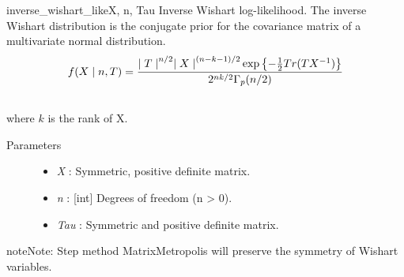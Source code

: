\hypertarget{pymc.distributions.inverse_wishart_like}{}\begin{funcdesc}{inverse\_wishart\_like}{X, n, Tau}
Inverse Wishart log-likelihood. The inverse Wishart distribution is the conjugate
prior for the covariance matrix of a multivariate normal distribution.
\begin{gather}
\begin{split}f(X \mid n, T) = \frac{{\mid T \mid}^{n/2}{\mid X \mid}^{(n-k-1)/2} \exp\left\{ -\frac{1}{2} Tr(TX^{-1}) \right\}}{2^{nk/2} \Gamma_p(n/2)}\end{split}\notag\\\begin{split}\end{split}\notag
\end{gather}
where $k$ is the rank of X.
\begin{description}
\item[Parameters] \leavevmode\begin{itemize}
\item {}
\emph{X} : Symmetric, positive definite matrix.

\item {}
\emph{n} : {[}int{]} Degrees of freedom (n \textgreater{} 0).

\item {}
\emph{Tau} : Symmetric and positive definite matrix.

\end{itemize}

\end{description}

\begin{notice}{note}{Note:}
Step method MatrixMetropolis will preserve the symmetry of Wishart variables.
\end{notice}
\end{funcdesc}

